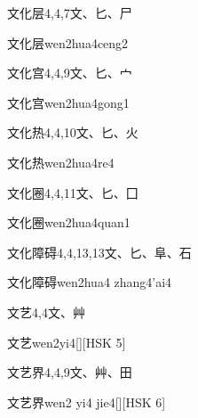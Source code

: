 \begin{Entry}{文化层}{4,4,7}{⽂、⼔、⼫}
  \begin{Phonetics}{文化层}{wen2hua4ceng2}
  \end{Phonetics}
\end{Entry}

\begin{Entry}{文化宫}{4,4,9}{⽂、⼔、⼧}
  \begin{Phonetics}{文化宫}{wen2hua4gong1}
  \end{Phonetics}
\end{Entry}

\begin{Entry}{文化热}{4,4,10}{⽂、⼔、⽕}
  \begin{Phonetics}{文化热}{wen2hua4re4}
  \end{Phonetics}
\end{Entry}

\begin{Entry}{文化圈}{4,4,11}{⽂、⼔、⼞}
  \begin{Phonetics}{文化圈}{wen2hua4quan1}
  \end{Phonetics}
\end{Entry}

\begin{Entry}{文化障碍}{4,4,13,13}{⽂、⼔、⾩、⽯}
  \begin{Phonetics}{文化障碍}{wen2hua4 zhang4'ai4}
  \end{Phonetics}
\end{Entry}

\begin{Entry}{文艺}{4,4}{⽂、⾋}
  \begin{Phonetics}{文艺}{wen2yi4}[][HSK 5]
  \end{Phonetics}
\end{Entry}

\begin{Entry}{文艺界}{4,4,9}{⽂、⾋、⽥}
  \begin{Phonetics}{文艺界}{wen2 yi4 jie4}[][HSK 6]
  \end{Phonetics}
\end{Entry}

